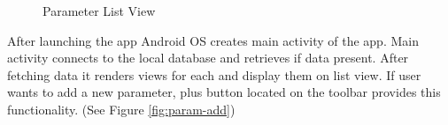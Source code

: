 \begin{figure}
	\centering
	\caption{Parameter List View}
	\label{fig:param-list}
\end{figure}

After launching the app Android OS creates main activity of the app. Main activity connects to the local database and retrieves if data present. After fetching data it renders views for each and display them on list view. If user wants to add a new parameter, plus button located on the toolbar provides this functionality. (See Figure \ref{fig:param-add})

